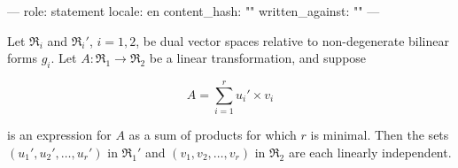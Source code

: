 ---
role: statement
locale: en
content_hash: ""
written_against: ""
---

Let $\mathfrak{R}_i$ and $\mathfrak{R}_i'$, $i = 1, 2$, be dual vector spaces relative to non-degenerate bilinear forms $g_i$. Let $A : \mathfrak{R}_1 \to \mathfrak{R}_2$ be a linear transformation, and suppose

$$A = \sum_{i=1}^r u_i' \times v_i$$

is an expression for $A$ as a sum of products for which $r$ is minimal. Then the sets $(u_1', u_2', \dots, u_r')$ in $\mathfrak{R}_1'$ and $(v_1, v_2, \dots, v_r)$ in $\mathfrak{R}_2$ are each linearly independent.
